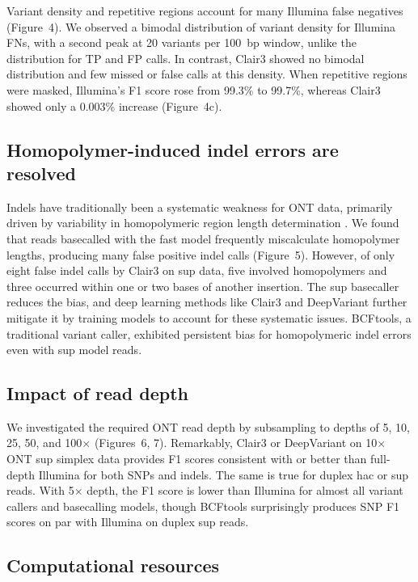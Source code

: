\documentclass[11pt]{article}
\begin{document}
Variant density and repetitive regions account for many Illumina false negatives (Figure~4). We observed a bimodal distribution of variant density for Illumina FNs, with a second peak at 20 variants per 100~bp window, unlike the distribution for TP and FP calls. In contrast, Clair3 showed no bimodal distribution and few missed or false calls at this density. When repetitive regions were masked, Illumina's F1 score rose from 99.3\% to 99.7\%, whereas Clair3 showed only a 0.003\% increase (Figure~4c).

\subsection{Homopolymer-induced indel errors are resolved}

Indels have traditionally been a systematic weakness for ONT data, primarily driven by variability in homopolymeric region length determination \citep{sahlin2021}. We found that reads basecalled with the fast model frequently miscalculate homopolymer lengths, producing many false positive indel calls (Figure~5). However, of only eight false indel calls by Clair3 on sup data, five involved homopolymers and three occurred within one or two bases of another insertion. The sup basecaller reduces the bias, and deep learning methods like Clair3 and DeepVariant further mitigate it by training models to account for these systematic issues. BCFtools, a traditional variant caller, exhibited persistent bias for homopolymeric indel errors even with sup model reads.

\subsection{Impact of read depth}

We investigated the required ONT read depth by subsampling to depths of 5, 10, 25, 50, and 100$\times$ (Figures~6, 7). Remarkably, Clair3 or DeepVariant on 10$\times$ ONT sup simplex data provides F1 scores consistent with or better than full-depth Illumina for both SNPs and indels. The same is true for duplex hac or sup reads. With 5$\times$ depth, the F1 score is lower than Illumina for almost all variant callers and basecalling models, though BCFtools surprisingly produces SNP F1 scores on par with Illumina on duplex sup reads.

\subsection{Computational resources}
\end{document}

